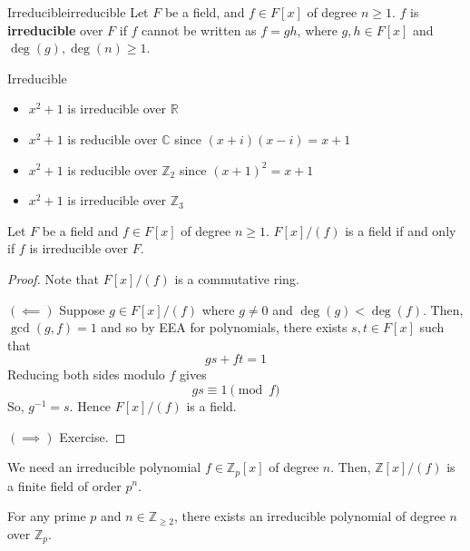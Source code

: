 
\begin{Definition}{Irreducible}{irreducible}
    Let $ F $ be a field, and $ f\in F[x] $ of degree $ n\geqslant 1 $.
    $ f $ is \textbf{irreducible} over $ F $ if $ f $ cannot be written
    as $ f=gh $, where $ g,h\in F[x] $ and $ \deg(g),\deg(n)\geqslant 1 $.
\end{Definition}

\begin{Example}{Irreducible}{}
    \begin{itemize}
        \item $ x^2+1 $ is irreducible over $ \mathbb{R} $
        \item $ x^2+1 $ is reducible over $ \mathbb{C} $ since $ (x+i)(x-i)=x+1 $
        \item $ x^2+1 $ is reducible over $ \mathbb{Z}_2 $ since $ (x+1)^2=x+1 $
        \item $ x^2+1 $ is irreducible over $ \mathbb{Z}_3 $
    \end{itemize}
\end{Example}

\begin{Theorem}{}{}
    Let $ F $ be a field and $ f\in F[x] $ of degree $ n\geqslant 1 $.
    $ F[x]/(f) $ is a field if and only if $ f $ is irreducible over $ F $.
\end{Theorem}

\begin{proof}
    Note that $ F[x]/(f) $ is a commutative ring.

    $ (\impliedby) $ Suppose $ g\in F[x]/(f) $ where $ g\neq 0 $
    and $ \deg(g)<\deg(f) $. Then, $ \gcd(g,f)=1 $ and so by EEA
    for polynomials, there exists $ s,t\in F[x] $ such that
    \[ gs+ft=1 \]
    Reducing both sides modulo $ f $ gives
    \[ gs\equiv 1 \pmod{f} \]
    So, $ g^{-1}=s $. Hence $ F[x]/(f) $ is a field.

    $ (\implies) $ Exercise.
\end{proof}

We need an irreducible polynomial $ f\in\mathbb{Z}_p[x] $ of degree $ n $.
Then, $ \mathbb{Z}[x]/(f) $ is a finite field of order $ p^n $.

\begin{Theorem}{}{}
    For any prime $ p $ and $ n\in\mathbb{Z}_{\geqslant 2} $, there exists
    an irreducible polynomial of degree $ n $ over $ \mathbb{Z}_p $.
\end{Theorem}

